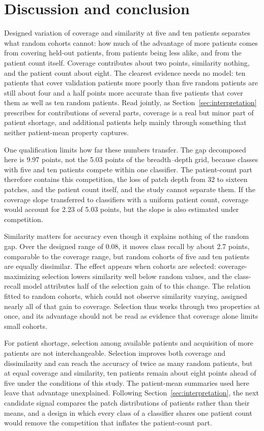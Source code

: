 \section{Discussion and conclusion}
\label{sec:discussion}
Designed variation of coverage and similarity at five and ten patients separates what random cohorts cannot: how much of the advantage of more patients comes from covering held-out patients, from patients being less alike, and from the patient count itself. Coverage contributes about two points, similarity nothing, and the patient count about eight. The clearest evidence needs no model: ten patients that cover validation patients more poorly than five random patients are still about four and a half points more accurate than five patients that cover them as well as ten random patients. Read jointly, as Section~\ref{sec:interpretation} prescribes for contributions of several parts, coverage is a real but minor part of patient shortage, and additional patients help mainly through something that neither patient-mean property captures.

One qualification limits how far these numbers transfer. The gap decomposed here is 9.97 points, not the 5.03 points of the breadth--depth grid, because classes with five and ten patients compete within one classifier. The patient-count part therefore contains this competition, the loss of patch depth from 32 to sixteen patches, and the patient count itself, and the study cannot separate them. If the coverage slope transferred to classifiers with a uniform patient count, coverage would account for 2.23 of 5.03 points, but the slope is also estimated under competition.

Similarity matters for accuracy even though it explains nothing of the random gap. Over the designed range of 0.08, it moves class recall by about 2.7 points, comparable to the coverage range, but random cohorts of five and ten patients are equally dissimilar. The effect appears when cohorts are selected: coverage-maximizing selection lowers similarity well below random values, and the class-recall model attributes half of the selection gain of \citet{queisler2026shortageSelection} to this change. The relation fitted to random cohorts, which could not observe similarity varying, assigned nearly all of that gain to coverage. Selection thus works through two properties at once, and its advantage should not be read as evidence that coverage alone limits small cohorts.

For patient shortage, selection among available patients and acquisition of more patients are not interchangeable. Selection improves both coverage and dissimilarity and can reach the accuracy of twice as many random patients, but at equal coverage and similarity, ten patients remain about eight points ahead of five under the conditions of this study. The patient-mean summaries used here leave that advantage unexplained. Following Section~\ref{sec:interpretation}, the next candidate signal compares the patch distributions of patients rather than their means, and a design in which every class of a classifier shares one patient count would remove the competition that inflates the patient-count part.
